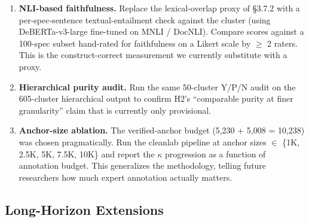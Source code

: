\documentclass[sigconf, nonacm, anonymous, balance=false]{acmart}
\begin{document}
\begin{enumerate}
\def\labelenumi{\arabic{enumi}.}
\setcounter{enumi}{4}
\item
  \textbf{NLI-based faithfulness.} Replace the lexical-overlap proxy of \S3.7.2 with a per-spec-sentence textual-entailment check against the cluster (using DeBERTa-v3-large fine-tuned on MNLI / DocNLI). Compare scores against a 100-spec subset hand-rated for faithfulness on a Likert scale by $\geq$ 2 raters. This is the construct-correct measurement we currently substitute with a proxy.
\item
  \textbf{Hierarchical purity audit.} Run the same 50-cluster Y/P/N audit on the 605-cluster hierarchical output to confirm H2's ``comparable purity at finer granularity'' claim that is currently only provisional.
\item
  \textbf{Anchor-size ablation.} The verified-anchor budget (5,230 + 5,008 = 10,238) was chosen pragmatically. Run the cleanlab pipeline at anchor sizes $\in$ \{1K, 2.5K, 5K, 7.5K, 10K\} and report the $\kappa$ progression as a function of annotation budget. This generalizes the methodology, telling future researchers how much expert annotation actually matters.
\end{enumerate}

\subsection{Long-Horizon Extensions}\label{long-horizon-extensions}
\end{document}
